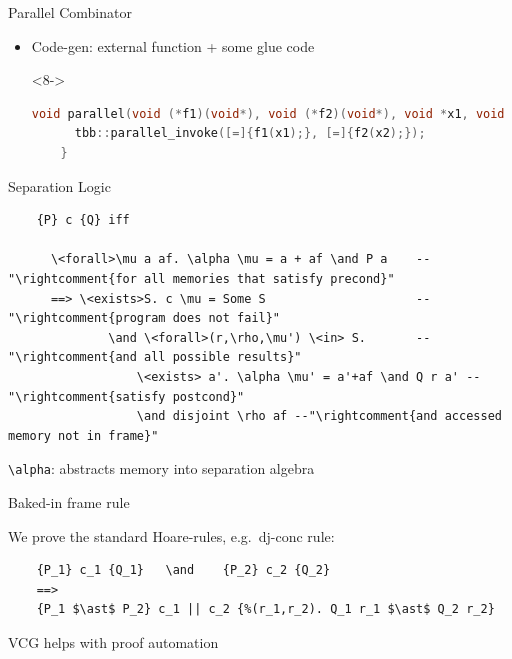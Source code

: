\documentclass[fleqn]{beamer}
\begin{document}
\begin{frame}[t,fragile]{Parallel Combinator}
\begin{itemize}
\begin{onlyenv}
\begin{itemize}
      \end{itemize}
    \end{onlyenv}
   \item<7-> Code-gen: external function + some glue code
    \begin{onlyenv}<8->
    \small
    \begin{lstlisting}[language=C++]
    void parallel(void (*f1)(void*), void (*f2)(void*), void *x1, void *x2) {
      tbb::parallel_invoke([=]{f1(x1);}, [=]{f2(x2);});
    }
    \end{lstlisting}
    \end{onlyenv}


  \end{itemize}
\end{frame}
\begin{frame}[fragile]{Separation Logic}
  \begin{lstlisting}
    {P} c {Q} iff

      \<forall>\mu a af. \alpha \mu = a + af \and P a    --"\rightcomment{for all memories that satisfy precond}"
      ==> \<exists>S. c \mu = Some S                     --"\rightcomment{program does not fail}"
              \and \<forall>(r,\rho,\mu') \<in> S.       --"\rightcomment{and all possible results}"
                  \<exists> a'. \alpha \mu' = a'+af \and Q r a' --"\rightcomment{satisfy postcond}"
                  \and disjoint \rho af --"\rightcomment{and accessed memory not in frame}"

  \end{lstlisting}

  \lstinline{\alpha}: abstracts memory into separation algebra

  Baked-in frame rule

  \pause
  We prove the standard Hoare-rules, e.g.\ dj-conc rule:
  \begin{lstlisting}
    {P_1} c_1 {Q_1}   \and    {P_2} c_2 {Q_2}
    ==>
    {P_1 $\ast$ P_2} c_1 || c_2 {%(r_1,r_2). Q_1 r_1 $\ast$ Q_2 r_2}
  \end{lstlisting}

  \pause
  VCG helps with proof automation

\end{frame}
\end{document}
